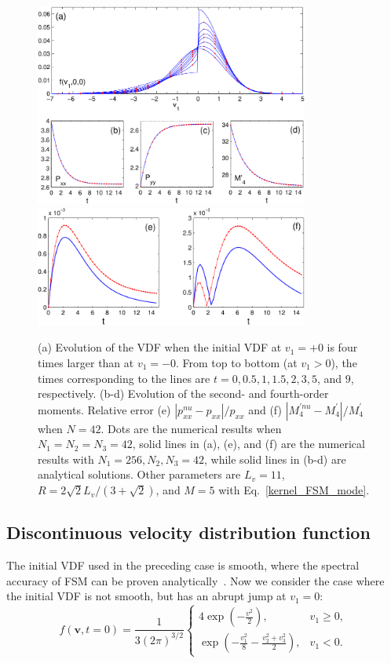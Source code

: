 \begin{figure}[t]
\centering \includegraphics[width=9cm]{Chapter4/IMG/test3_2.pdf}\\
\vskip 0.3cm 
\centering \includegraphics[width=9cm]{Chapter4/IMG/test_error3.pdf}
\caption{ 
	(a) Evolution of the VDF when the initial VDF at $v_1=+0$ is four times larger than at $v_1=-0$. From top to bottom (at $v_1>0$), the times corresponding to the lines are $t=0, 0.5, 1, 1.5, 2, 3, 5$, and $9$, respectively. (b-d) Evolution of the second- and fourth-order moments. Relative error (e) $|p^{nu}_{xx}-p_{xx}|/p_{xx}$ and (f) $|M^{'nu}_{4}-M_{4}^{'}|/M_{4}^{'}$ when $N=42$. Dots are the numerical results when $N_1=N_2=N_3=42$, solid lines in (a), (e), and (f) are the numerical results with $N_1=256, N_2,N_3=42$, while solid lines in (b-d) are analytical solutions. Other parameters are $L_v=11$, $R=2\sqrt{2}L_v/(3+\sqrt{2})$, and $M=5$ with Eq.~\eqref{kernel_FSM_mode}.
} 
\label{test3}
\end{figure}


\subsection{Discontinuous velocity distribution function}

The initial VDF used in the preceding case is smooth, where the spectral accuracy of FSM can be proven analytically~\cite{Mouhot2006}. Now we consider the case where the initial VDF is not smooth, but has an abrupt jump at $v_1=0$:
\begin{equation}\label{initial_3}
f(\bm{v},t=0)=\frac{1}{3(2\pi)^{3/2}}
\begin{cases}
4\exp\left(-\frac{{v^2}}{2}\right) , & v_1\ge0,  \\
\exp\left(-\frac{v_1^2}{8}-\frac{v_2^2+v_3^2}{2}\right), &  v_1<0.
\end{cases}
\end{equation}

